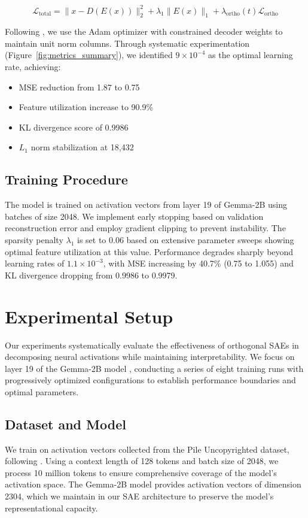 \documentclass{article} %
\begin{document}
\begin{equation}
    \mathcal{L}_{\text{total}} = \|x - D(E(x))\|_2^2 + \lambda_1\|E(x)\|_1 + \lambda_{\text{ortho}}(t)\mathcal{L}_{\text{ortho}}
\end{equation}

Following \cite{mudideEfficientDictionaryLearning2024a}, we use the Adam optimizer with constrained decoder weights to maintain unit norm columns. Through systematic experimentation (Figure~\ref{fig:metrics_summary}), we identified $9 \times 10^{-4}$ as the optimal learning rate, achieving:
\begin{itemize}
    \item MSE reduction from 1.87 to 0.75
    \item Feature utilization increase to 90.9\%
    \item KL divergence score of 0.9986
    \item $L_1$ norm stabilization at 18,432
\end{itemize}

\subsection{Training Procedure}
The model is trained on activation vectors from layer 19 of Gemma-2B using batches of size 2048. We implement early stopping based on validation reconstruction error and employ gradient clipping to prevent instability. The sparsity penalty $\lambda_1$ is set to 0.06 based on extensive parameter sweeps showing optimal feature utilization at this value. Performance degrades sharply beyond learning rates of $1.1 \times 10^{-3}$, with MSE increasing by 40.7\% (0.75 to 1.055) and KL divergence dropping from 0.9986 to 0.9979.

\section{Experimental Setup}
\label{sec:experimental}

Our experiments systematically evaluate the effectiveness of orthogonal SAEs in decomposing neural activations while maintaining interpretability. We focus on layer 19 of the Gemma-2B model \cite{gaoScalingEvaluatingSparse}, conducting a series of eight training runs with progressively optimized configurations to establish performance boundaries and optimal parameters.

\subsection{Dataset and Model}
We train on activation vectors collected from the Pile Uncopyrighted dataset, following \cite{pauloAutomaticallyInterpretingMillions2024}. Using a context length of 128 tokens and batch size of 2048, we process 10 million tokens to ensure comprehensive coverage of the model's activation space. The Gemma-2B model provides activation vectors of dimension 2304, which we maintain in our SAE architecture to preserve the model's representational capacity.
\end{document}
